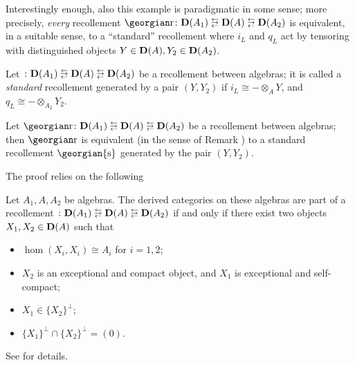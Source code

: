 Interestingly enough, also this example is paradigmatic in some sense; more precisely, \emph{every} recollement $\rec\colon \D(A_1)\lrlarrows \D(A) \lrlarrows \D(A_2)$ is equivalent, in a suitable sense, to a ``standard'' recollement where $i_L$ and $q_L$ act by tensoring with distinguished objects $Y\in \textbf{D}(A), Y_2\in \textbf{D}(A_2)$.
\begin{definition}
Let {} $\colon \D(A_1)\lrlarrows \D(A) \lrlarrows \D(A_2)$ be a recollement between algebras; it is called a \emph{standard} recollement generated by a pair $(Y,Y_2)$ if $i_L \cong -\otimes_A Y$, and $q_L \cong -\otimes_{A_2}Y_2$.
\end{definition}
\begin{proposition}
Let $\rec \colon \D(A_1)\lrlarrows \D(A) \lrlarrows \D(A_2)$ be a recollement between algebras; then $\rec$ is equivalent (in the sense of Remark ) to a standard recollement $\text{\georgian{s}}$ generated by the pair $(Y,Y_2)$.
\end{proposition}
The proof relies on the following
\begin{lemma}
Let $A_1, A, A_2$ be algebras. The derived categories on these algebras are part of a recollement $\colon \D(A_1)\lrlarrows \D(A) \lrlarrows \D(A_2)$ if and only if there exist two objects $X_1, X_2 \in\textbf{D}(A)$ such that
\begin{itemize}
\item $\hom(X_i, X_i)\cong A_i$ for $i=1,2$;
\item $X_2$ is an exceptional and compact object, and $X_1$ is exceptional and self\hyp{}compact;
\item $X_1 \in \{ X_2\}^\perp$;
\item $\{X_1\}^\perp\cap\{X_2\}^\perp = (0)$.
\end{itemize}
\end{lemma}
See \cite[\S\textbf{2}]{han2014recollements} for details.
